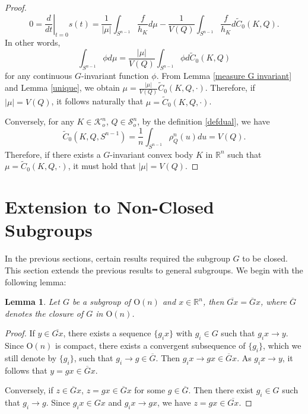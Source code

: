 \documentclass[12pt, reqno]{amsart}
\newtheorem{lemma}[theorem]{Lemma}
\theoremstyle{definition}
\theoremstyle{remark}
\numberwithin{equation}{section}
\newcommand{\Rn}{\mathbb{R}^{n}}
\newcommand{\Sn}{S^{n-1}}
\newcommand{\On}{\mathrm{O}(n)}
\newcommand{\clG}{\overline{G}}
\begin{document}
\begin{proof}
	\begin{equation*}
		0=\left.\frac{d}{d t}\right|_{t=0}	s(t)=\frac{1}{|\mu|}\int_{S^{n-1}}\frac{f}{h_{K}}d\mu-\frac{1}{V(Q)}\int_{S^{n-1}}\frac{f}{h_{K}}d\widetilde{C}_{0}(K,Q).
	\end{equation*}
	In other words,
	\begin{equation}
		\int_{S^{n-1}}\phi d\mu=\frac{|\mu|}{V(Q)} \int_{S^{n-1}}\phi d\widetilde{C}_{0}(K,Q)
	\end{equation}
	for any  continuous $G$-invariant function $\phi$. From Lemma \ref{measure G invariant} and Lemma \ref{unique}, we obtain $\mu=\frac{|\mu|}{V(Q)}\widetilde{C}_{0}(K,Q,\cdot)$. Therefore, if $|\mu|=V(Q)$, it follows naturally that $\mu=\widetilde{C}_{0}(K,Q,\cdot)$.
	
	Conversely, for any $K \in \mathcal{K}_{o}^{n}$, $Q\in \mathcal{S}_{o}^{n}$,   by the definition \eqref{defdual}, we have
	\begin{equation*}
		\widetilde{C}_{0}(K,Q,\Sn)=\frac{1}{n}\int_{\Sn}\rho_{Q}^{n}(u)du=V(Q).
	\end{equation*}
Therefore,	if there exists a $G$-invariant convex body $K$ in $\mathbb{R}^n$ such that
	$\mu=\widetilde{C}_{0}(K, Q,\cdot)$, it must hold that $|\mu|=V(Q)$.
\end{proof}



\section{Extension to Non-Closed Subgroups}\label{open}
In the previous sections, certain results required the subgroup $G$ to be closed. This section extends the previous results to general  subgroups. We begin with the following  lemma:
	 \begin{lemma}\label{ap1}
	 		Let $ G $ be a  subgroup of   $ \On $ and $x\in \Rn$, then $\overline{Gx}=\overline{G}x$, where $\clG$ denotes the closure of $G$ in $\On$.
	 \end{lemma}
	 
	 \begin{proof}
	 	If $y\in \overline{Gx}$, there exists a sequence $\{g_{i}x\}$ with $g_{i}\in G$ such that $g_{i}x\rightarrow y$. Since $\On$ is compact, there exists a convergent subsequence of $\{g_{i}\}$, which we still denote by $\{g_{i}\}$, such that $g_{i}\rightarrow g \in \overline{G}$. Then $g_{i}x\rightarrow gx\in\overline{G}x$. As $g_{i}x\rightarrow y$, it follows that $y=gx\in\overline{G}x$.
	 	
	 	Conversely, if $z\in\overline{G}x$, $z=gx\in\overline{G}x$ for some $g\in\overline{G}$. Then there exist $g_{i}\in G$ such that $g_{i}\rightarrow g$. Since $g_{i}x \in Gx$ and $g_{i}x\rightarrow gx$, we have $z=gx\in\overline{Gx}$.
	 \end{proof}
	
\end{document}
